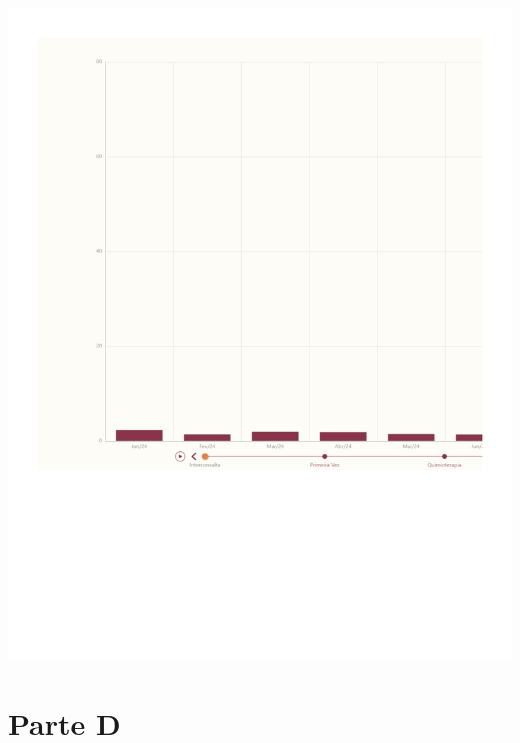 \documentclass[
  letterpaper,
  DIV=11,
  numbers=noendperiod]{scrreprt}
\begin{document}
\includegraphics{2024_files/figure-pdf/unnamed-chunk-8-1.pdf}

\section{Parte D}
\end{document}
